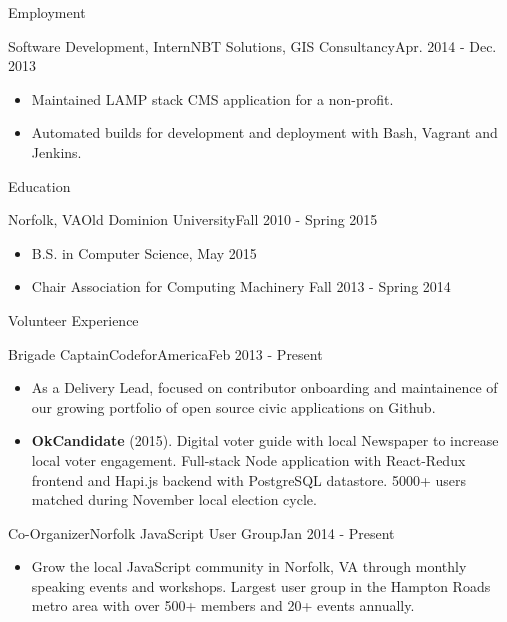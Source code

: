 \documentclass[]{mcdowellcv}
\begin{document}
\begin{cvsection}{Employment}
		\begin{cvsubsection}{Software Development, Intern}{NBT Solutions, GIS Consultancy}{Apr. 2014 - Dec. 2013}
			\begin{itemize}
				\item Maintained LAMP stack CMS application for a non-profit.
				\item Automated builds for development and deployment with Bash, Vagrant and Jenkins.
			\end{itemize}
		\end{cvsubsection}

	\end{cvsection}

	\begin{cvsection}{Education}
		\begin{cvsubsection}{Norfolk, VA}{Old Dominion University}{Fall 2010 - Spring 2015}
			\begin{itemize}
				\item B.S. in Computer Science, May 2015
				\item Chair Association for Computing Machinery Fall 2013 - Spring 2014
			\end{itemize}
		\end{cvsubsection}
	\end{cvsection}

	\begin{cvsection}{Volunteer Experience}
		\begin{cvsubsection}{Brigade Captain}{CodeforAmerica}{Feb 2013 - Present}
			\begin{itemize}
				\item As a Delivery Lead, focused on contributor onboarding and maintainence of our growing portfolio of open source civic applications on Github.
				\item \textbf{OkCandidate} (2015). Digital voter guide with local Newspaper to increase local voter engagement. Full-stack Node application with React-Redux frontend and Hapi.js backend with PostgreSQL datastore. 5000+ users matched during November local election cycle.
			\end{itemize}

		\end{cvsubsection}

		\begin{cvsubsection}{Co-Organizer}{Norfolk JavaScript User Group}{Jan 2014 - Present}
			\begin{itemize}
				\item Grow the local JavaScript community in Norfolk, VA through monthly speaking events and workshops. Largest user group in the Hampton Roads metro area with over 500+ members and 20+ events annually.
			\end{itemize}
		\end{cvsubsection}

	\end{cvsection}
\end{document}
